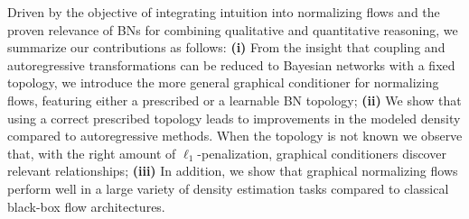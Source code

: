 Driven by the objective of integrating intuition into normalizing flows and the proven relevance of BNs for combining qualitative and quantitative reasoning, we summarize our contributions as follows:
\textbf{(i)} From the insight that coupling and autoregressive transformations can be reduced to Bayesian networks with a fixed topology, we introduce the more general graphical conditioner for normalizing flows, featuring either a prescribed or a learnable BN topology; \textbf{(ii)} We show that using a correct prescribed topology leads to improvements in the modeled density compared to autoregressive methods. When the topology is not known we observe that, with the right amount of $\ell_1$-penalization, graphical conditioners discover relevant relationships; \textbf{(iii)} In addition, we show that graphical normalizing flows perform well in a large variety of density estimation tasks compared to classical black-box flow architectures.
